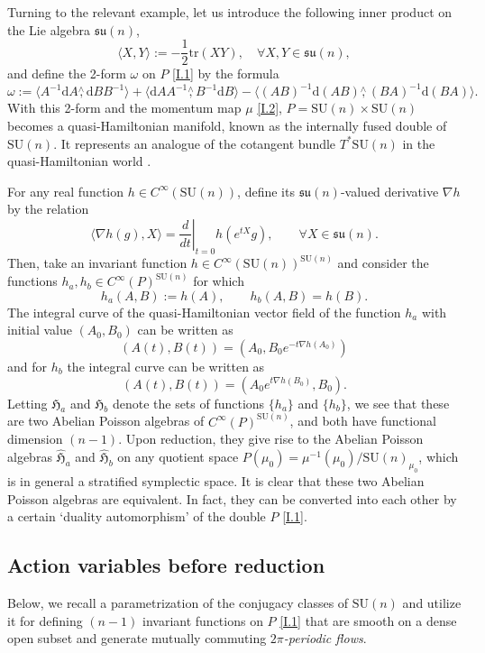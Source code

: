 \documentclass[a4paper,11pt,reqno]{amsart}
\theoremstyle{definition}
\numberwithin{equation}{section}
\newcommand{\be}{\begin{equation}}
\newcommand{\ee}{\end{equation}}
\def\tr{\mathrm{tr}}                        %
\def\SU{\mathrm{SU}}                        %
\def\fH{{\mathfrak{H}}}                     %
\def\dt {\left.\frac{d}{dt}\right|_{t=0}}   %
\def\su{{\mathfrak{su}}}                    %
\begin{document}
Turning to the relevant example,
let us introduce the following inner product on the Lie algebra $\su(n)$,
\be
\langle X, Y\rangle := - \frac{1}{2} \tr(XY),\quad
\forall X,Y\in \su(n),
\label{T2}\ee
and define the 2-form $\omega$ on $P$ \eqref{I.1} by the formula
\be
\omega :=  \langle A^{-1} \mathrm{d}A \stackrel{\wedge}{,} \mathrm{d}B B^{-1}\rangle
+\langle  \mathrm{d}A A^{-1} \stackrel{\wedge}{,} B^{-1} \mathrm{d}B \rangle
- \langle (AB)^{-1} \mathrm{d} (A B) \stackrel{\wedge}{,} (BA)^{-1} \mathrm{d} (BA)
\rangle.
\label{T3}\ee
With this 2-form and the momentum map $\mu$ \eqref{I.2}, $P= \SU(n) \times \SU(n)$ becomes
a quasi-Hamiltonian manifold, known as the internally fused double of
$\SU(n)$.
It represents an analogue of the cotangent bundle
$T^*\SU(n)$ in the quasi-Hamiltonian world \cite{AMM}.

For any real function $h\in C^\infty(\SU(n))$,  define its $\su(n)$-valued derivative $\nabla h$  by
the relation
\be
\langle \nabla h(g), X \rangle = \dt h(e^{tX} g), \qquad \forall X \in \su(n).
\label{T4}\ee
Then, take an invariant function $h \in C^\infty(\SU(n))^{\SU(n)}$ and consider the functions $h_a, h_b \in C^\infty(P)^{\SU(n)}$ for which
\be
h_a(A,B):= h(A), \qquad
h_b(A,B) = h(B).
\label{T5}\ee
The integral curve of the quasi-Hamiltonian vector field of the function $h_a$ with initial value $(A_0, B_0)$ can be written as
\be
(A(t), B(t)) = (A_0, B_0 e^{-t \nabla h(A_0)})
\label{T6}\ee
and for $h_b$  the integral curve can be written as
\be
(A(t), B(t)) = (A_0 e^{t \nabla h(B_0)}, B_0).
\label{T7}\ee
Letting $\fH_a$ and $\fH_b$ denote the sets of functions $\{h_a\}$ and $\{h_b\}$, we see that these
are two Abelian Poisson algebras of $C^\infty(P)^{\SU(n)}$, and both have functional dimension $(n-1)$.
Upon reduction, they give rise to the Abelian Poisson algebras  $\hat \fH_a$ and $\hat \fH_b$
on any quotient space $P(\mu_0)=\mu^{-1}(\mu_0)/\SU(n)_{\mu_0}$, which is in general a stratified symplectic space.
It is clear that these two Abelian Poisson algebras are equivalent.
In fact, they can be converted into each other by a certain `duality automorphism' \cite{AMM,FKlim} of the double $P$ \eqref{I.1}.



\subsection{Action variables before reduction}\label{Sec22}

Below, we recall a  parametrization of the conjugacy classes of $\SU(n)$ and utilize it for defining
$(n-1)$ invariant functions on $P$ \eqref{I.1}
that are smooth on a dense open subset and
generate  mutually commuting  \emph{$2\pi$-periodic flows}.
\end{document}
